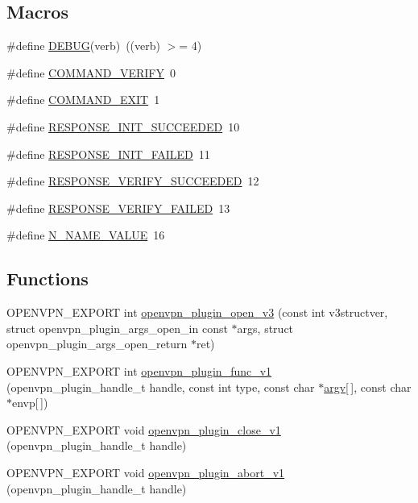 \subsection*{Macros}
\begin{DoxyCompactItemize}
\item 
\#define \hyperlink{auth-pam_8c_ae4f3a0b12dc80d88d6d981fcb3cd5979}{D\+E\+B\+U\+G}(verb)~((verb) $>$= 4)
\item 
\#define \hyperlink{auth-pam_8c_a68775fbe1de2459dae974af2dbc17560}{C\+O\+M\+M\+A\+N\+D\+\_\+\+V\+E\+R\+I\+F\+Y}~0
\item 
\#define \hyperlink{auth-pam_8c_abf1cea64e3b64a73512229f7e8d7ce76}{C\+O\+M\+M\+A\+N\+D\+\_\+\+E\+X\+I\+T}~1
\item 
\#define \hyperlink{auth-pam_8c_a6b557aae80cbe59c47433a0516b2cae5}{R\+E\+S\+P\+O\+N\+S\+E\+\_\+\+I\+N\+I\+T\+\_\+\+S\+U\+C\+C\+E\+E\+D\+E\+D}~10
\item 
\#define \hyperlink{auth-pam_8c_a9328d232099241e151d520f002d559de}{R\+E\+S\+P\+O\+N\+S\+E\+\_\+\+I\+N\+I\+T\+\_\+\+F\+A\+I\+L\+E\+D}~11
\item 
\#define \hyperlink{auth-pam_8c_adaa85f62f5bd8b22937b419e3dcf61ed}{R\+E\+S\+P\+O\+N\+S\+E\+\_\+\+V\+E\+R\+I\+F\+Y\+\_\+\+S\+U\+C\+C\+E\+E\+D\+E\+D}~12
\item 
\#define \hyperlink{auth-pam_8c_a9ec110c770ed93bb6932afa952c39f53}{R\+E\+S\+P\+O\+N\+S\+E\+\_\+\+V\+E\+R\+I\+F\+Y\+\_\+\+F\+A\+I\+L\+E\+D}~13
\item 
\#define \hyperlink{auth-pam_8c_a1c411657bfdbe01cd198f8b34eccb70c}{N\+\_\+\+N\+A\+M\+E\+\_\+\+V\+A\+L\+U\+E}~16
\end{DoxyCompactItemize}
\subsection*{Functions}
\begin{DoxyCompactItemize}
\item 
O\+P\+E\+N\+V\+P\+N\+\_\+\+E\+X\+P\+O\+R\+T int \hyperlink{auth-pam_8c_ac88c8a386b00fdf4f28f36048cbb8c5c}{openvpn\+\_\+plugin\+\_\+open\+\_\+v3} (const int v3structver, struct openvpn\+\_\+plugin\+\_\+args\+\_\+open\+\_\+in const $\ast$args, struct openvpn\+\_\+plugin\+\_\+args\+\_\+open\+\_\+return $\ast$ret)
\item 
O\+P\+E\+N\+V\+P\+N\+\_\+\+E\+X\+P\+O\+R\+T int \hyperlink{auth-pam_8c_a035baa3834038991bf6c493be0f1e774}{openvpn\+\_\+plugin\+\_\+func\+\_\+v1} (openvpn\+\_\+plugin\+\_\+handle\+\_\+t handle, const int type, const char $\ast$\hyperlink{structargv}{argv}\mbox{[}$\,$\mbox{]}, const char $\ast$envp\mbox{[}$\,$\mbox{]})
\item 
O\+P\+E\+N\+V\+P\+N\+\_\+\+E\+X\+P\+O\+R\+T void \hyperlink{auth-pam_8c_a09d524ab6e25324d37681b49d0b7abcc}{openvpn\+\_\+plugin\+\_\+close\+\_\+v1} (openvpn\+\_\+plugin\+\_\+handle\+\_\+t handle)
\item 
O\+P\+E\+N\+V\+P\+N\+\_\+\+E\+X\+P\+O\+R\+T void \hyperlink{auth-pam_8c_aa1dfa775aa39a416f5dd7e18205b7f6f}{openvpn\+\_\+plugin\+\_\+abort\+\_\+v1} (openvpn\+\_\+plugin\+\_\+handle\+\_\+t handle)
\end{DoxyCompactItemize}


